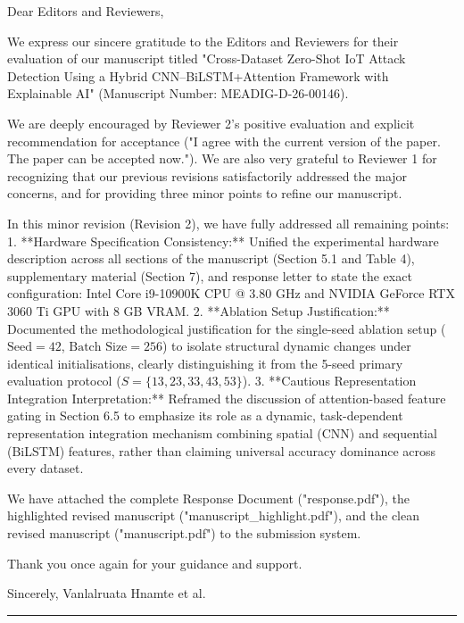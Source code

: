 \documentclass[11pt]{article}
\begin{document}
\begin{tcolorbox}[colback=boxbg,colframe=primaryblue,title=\textbf{Text for Main Submission System Response Box}]
Dear Editors and Reviewers,

We express our sincere gratitude to the Editors and Reviewers for their evaluation of our manuscript titled "Cross-Dataset Zero-Shot IoT Attack Detection Using a Hybrid CNN--BiLSTM+Attention Framework with Explainable AI" (Manuscript Number: MEADIG-D-26-00146).

We are deeply encouraged by Reviewer 2's positive evaluation and explicit recommendation for acceptance ("I agree with the current version of the paper. The paper can be accepted now."). We are also very grateful to Reviewer 1 for recognizing that our previous revisions satisfactorily addressed the major concerns, and for providing three minor points to refine our manuscript.

In this minor revision (Revision 2), we have fully addressed all remaining points:
1. **Hardware Specification Consistency:** Unified the experimental hardware description across all sections of the manuscript (Section 5.1 and Table 4), supplementary material (Section 7), and response letter to state the exact configuration: Intel Core i9-10900K CPU @ 3.80 GHz and NVIDIA GeForce RTX 3060 Ti GPU with 8 GB VRAM.
2. **Ablation Setup Justification:** Documented the methodological justification for the single-seed ablation setup ($\text{Seed} = 42$, $\text{Batch Size} = 256$) to isolate structural dynamic changes under identical initialisations, clearly distinguishing it from the 5-seed primary evaluation protocol ($S=\{13, 23, 33, 43, 53\}$).
3. **Cautious Representation Integration Interpretation:** Reframed the discussion of attention-based feature gating in Section 6.5 to emphasize its role as a dynamic, task-dependent representation integration mechanism combining spatial (CNN) and sequential (BiLSTM) features, rather than claiming universal accuracy dominance across every dataset.

We have attached the complete Response Document ("response.pdf"), the highlighted revised manuscript ("manuscript_highlight.pdf"), and the clean revised manuscript ("manuscript.pdf") to the submission system.

Thank you once again for your guidance and support.

Sincerely,  
Vanlalruata Hnamte et al.
\end{tcolorbox}

\vspace{1.5em}
\hrule
\vspace{1.5em}
\end{document}
